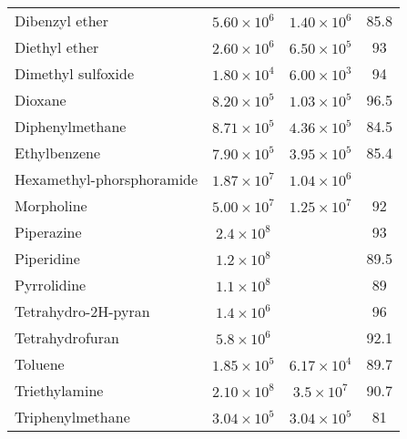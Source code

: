 \begin{longtable}{m{3.1cm} | c c c}
 Dibenzyl ether                 & $ 5.60 \times 10^6$ & $1.40 \times 10^6 $ &      85.8 \\
 Diethyl ether                  & $ 2.60 \times 10^6$ & $6.50 \times 10^5 $ &        93 \\
 Dimethyl sulfoxide              & $ 1.80 \times 10^4$ & $6.00 \times 10^3 $ &        94 \\
 Dioxane                        & $ 8.20 \times 10^5$ & $1.03 \times 10^5 $ &      96.5 \\
 Diphenylmethane                & $ 8.71 \times 10^5$ & $4.36 \times 10^5 $ &      84.5 \\
 Ethylbenzene                   & $ 7.90 \times 10^5$ & $3.95 \times 10^5 $ &      85.4 \\
 Hexamethyl-phorsphoramide       & $ 1.87 \times 10^7$ & $1.04 \times 10^6 $ &           \\
 Morpholine                     & $ 5.00 \times 10^7$ & $1.25 \times 10^7 $ &        92 \\
 Piperazine                     & $ 2.4 \times 10^8 $ &                &        93 \\
 Piperidine                     & $ 1.2 \times 10^8 $ &                &      89.5 \\
 Pyrrolidine                    & $ 1.1 \times 10^8 $ &                &        89 \\
 Tetrahydro-2H-pyran            & $ 1.4 \times 10^6 $ &                &        96 \\
 Tetrahydrofuran                & $ 5.8 \times 10^6 $ &                &      92.1 \\
 Toluene                        & $ 1.85 \times 10^5$ & $6.17 \times 10^4 $ &      89.7 \\
 Triethylamine                  & $ 2.10 \times 10^8$ & $3.5 \times 10^7  $ &      90.7 \\
 Triphenylmethane               & $ 3.04 \times 10^5$ & $3.04 \times 10^5 $ &        81 \\
\end{longtable}
